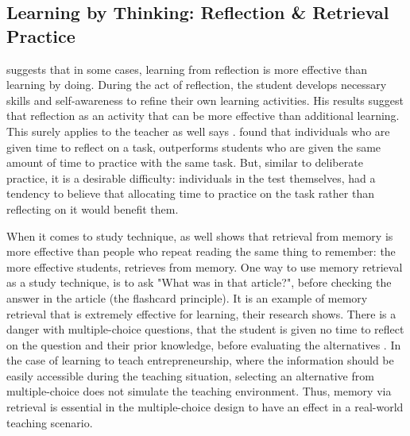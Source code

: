   \subsection{Learning by Thinking: Reflection \& Retrieval Practice}\label{learningbythinking}

  \cite{stefano} suggests that in some cases, learning from reflection is more effective than learning by doing. During the act of reflection, the student develops necessary skills and self-awareness to refine their own learning activities. His results suggest that reflection as an activity that can be more effective than additional learning. This surely applies to the teacher as well says \cite{luckin}. \cite{stefano} found that individuals who are given time to reflect on a task, outperforms students who are given the same amount of time to practice with the same task. But, similar to deliberate practice, it is a desirable difficulty: individuals in the test themselves, had a tendency to believe that allocating time to practice on the task rather than reflecting on it would benefit them.


  When it comes to study technique, \cite{bjork} as well shows that retrieval from memory is more effective than people who repeat reading the same thing to remember: the more effective students, retrieves from memory. One way to use memory retrieval as a study technique, is to ask "What was in that article?", before checking the answer in the article (the flashcard principle). It is an example of memory retrieval that is extremely effective for learning, their research shows. There is a danger with multiple-choice questions, that the student is given no time to reflect on the question and their prior knowledge, before evaluating the alternatives \citep{nicol}. In the case of learning to teach entrepreneurship, where the information should be easily accessible during the teaching situation, selecting an alternative from multiple-choice does not simulate the teaching environment. Thus, memory via retrieval is essential in the multiple-choice design to have an effect in a real-world teaching scenario.



%
